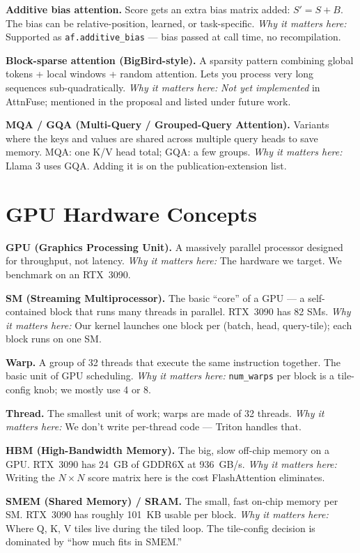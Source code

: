 \documentclass[11pt]{article}
\newcommand{\termw}[3]{%
  \par\smallskip
  \noindent\textbf{\color{blue!50!black}#1.} #2 \emph{\color{black!60}Why it matters here:} #3\par
}
\begin{document}
\termw{Additive bias attention}
{Score gets an extra bias matrix added: $S' = S + B$. The bias can be
relative-position, learned, or task-specific.}
{Supported as \texttt{af.additive\_bias} --- bias passed at call time, no
recompilation.}

\termw{Block-sparse attention (BigBird-style)}
{A sparsity pattern combining global tokens + local windows + random
attention. Lets you process very long sequences sub-quadratically.}
{\emph{Not yet implemented} in AttnFuse; mentioned in the proposal and
listed under future work.}

\termw{MQA / GQA (Multi-Query / Grouped-Query Attention)}
{Variants where the keys and values are shared across multiple query heads
to save memory. MQA: one K/V head total; GQA: a few groups.}
{Llama 3 uses GQA. Adding it is on the publication-extension list.}

\section{GPU Hardware Concepts}

\termw{GPU (Graphics Processing Unit)}
{A massively parallel processor designed for throughput, not latency.}
{The hardware we target. We benchmark on an RTX~3090.}

\termw{SM (Streaming Multiprocessor)}
{The basic ``core'' of a GPU --- a self-contained block that runs many
threads in parallel. RTX~3090 has 82 SMs.}
{Our kernel launches one block per (batch, head, query-tile); each block
runs on one SM.}

\termw{Warp}
{A group of 32 threads that execute the same instruction together. The
basic unit of GPU scheduling.}
{\texttt{num\_warps} per block is a tile-config knob; we mostly use 4 or 8.}

\termw{Thread}
{The smallest unit of work; warps are made of 32 threads.}
{We don't write per-thread code --- Triton handles that.}

\termw{HBM (High-Bandwidth Memory)}
{The big, slow off-chip memory on a GPU. RTX~3090 has 24~GB of GDDR6X at
936~GB/s.}
{Writing the $N \times N$ score matrix here is the cost FlashAttention
eliminates.}

\termw{SMEM (Shared Memory) / SRAM}
{The small, fast on-chip memory per SM. RTX~3090 has roughly 101~KB
usable per block.}
{Where Q, K, V tiles live during the tiled loop. The tile-config decision
is dominated by ``how much fits in SMEM.''}
\end{document}

